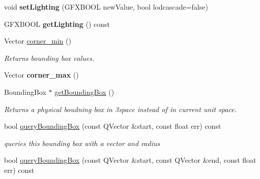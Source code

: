 \begin{DoxyCompactItemize}
\item 
void {\bfseries set\+Lighting} (G\+F\+X\+B\+O\+OL new\+Value, bool lodcascade=false)\hypertarget{classMesh_ae237f15498d1577d2f2c0afec1d7c0d7}{}\label{classMesh_ae237f15498d1577d2f2c0afec1d7c0d7}

\item 
G\+F\+X\+B\+O\+OL {\bfseries get\+Lighting} () const \hypertarget{classMesh_ac5d54bdc71a6467267fc2a5776589274}{}\label{classMesh_ac5d54bdc71a6467267fc2a5776589274}

\item 
Vector \hyperlink{classMesh_ab435109e64381d67ee4d7266ee3aa9ce}{corner\+\_\+min} ()\hypertarget{classMesh_ab435109e64381d67ee4d7266ee3aa9ce}{}\label{classMesh_ab435109e64381d67ee4d7266ee3aa9ce}

\begin{DoxyCompactList}\small\item\em Returns bounding box values. \end{DoxyCompactList}\item 
Vector {\bfseries corner\+\_\+max} ()\hypertarget{classMesh_a1a1ce83fd3f1762ec58d0589075ea921}{}\label{classMesh_a1a1ce83fd3f1762ec58d0589075ea921}

\item 
Bounding\+Box $\ast$ \hyperlink{classMesh_a8df1563cd0c82eb094f06fc5134b7993}{get\+Bounding\+Box} ()\hypertarget{classMesh_a8df1563cd0c82eb094f06fc5134b7993}{}\label{classMesh_a8df1563cd0c82eb094f06fc5134b7993}

\begin{DoxyCompactList}\small\item\em Returns a physical boudning box in 3space instead of in current unit space. \end{DoxyCompactList}\item 
bool \hyperlink{classMesh_a23a4ede839804d68874e957e07e9a7b5}{query\+Bounding\+Box} (const Q\+Vector \&start, const float err) const \hypertarget{classMesh_a23a4ede839804d68874e957e07e9a7b5}{}\label{classMesh_a23a4ede839804d68874e957e07e9a7b5}

\begin{DoxyCompactList}\small\item\em queries this bounding box with a vector and radius \end{DoxyCompactList}\item 
bool \hyperlink{classMesh_a4279dca557dddaf7da23ad4151c4ba9f}{query\+Bounding\+Box} (const Q\+Vector \&start, const Q\+Vector \&end, const float err) const \hypertarget{classMesh_a4279dca557dddaf7da23ad4151c4ba9f}{}\label{classMesh_a4279dca557dddaf7da23ad4151c4ba9f}


\end{DoxyCompactItemize}
